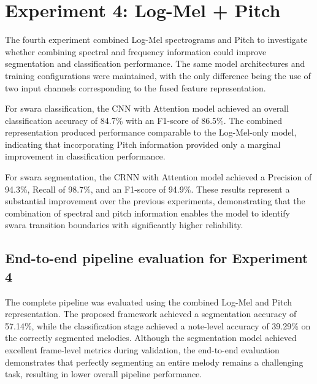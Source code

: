 
\section{Experiment 4: Log-Mel + Pitch}

The fourth experiment combined Log-Mel spectrograms and Pitch to investigate whether combining spectral and frequency information could improve segmentation and classification performance. The same model architectures and training configurations were maintained, with the only difference being the use of two input channels corresponding to the fused feature representation.

For swara classification, the CNN with Attention model achieved an overall classification accuracy of 84.7\% with an F1-score of 86.5\%. The combined representation produced performance comparable to the Log-Mel-only model, indicating that incorporating Pitch information provided only a marginal improvement in classification performance.


For swara segmentation, the CRNN with Attention model achieved a Precision of 94.3\%, Recall of 98.7\%, and an F1-score of 94.9\%. These results represent a substantial improvement over the previous experiments, demonstrating that the combination of spectral and pitch information enables the model to identify swara transition boundaries with significantly higher reliability.


\subsection*{End-to-end pipeline evaluation for Experiment 4}

The complete pipeline was evaluated using the combined Log-Mel and Pitch representation. The proposed framework achieved a segmentation accuracy of 57.14\%, while the classification stage achieved a note-level accuracy of 39.29\% on the correctly segmented melodies. Although the segmentation model achieved excellent frame-level metrics during validation, the end-to-end evaluation demonstrates that perfectly segmenting an entire melody remains a challenging task, resulting in lower overall pipeline performance.

